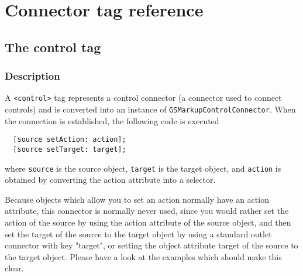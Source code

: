 
\section{Connector tag reference}

\subsection{The control tag}

\subsubsection{Description}
A \texttt{<control>} tag represents a control connector (a connector
used to connect controls) and is converted into an instance of
\texttt{GSMarkupControlConnector}.  When the connection is
established, the following code is executed
\begin{verbatim}
  [source setAction: action];
  [source setTarget: target];
\end{verbatim}
where \texttt{source} is the source object, \texttt{target} is the
target object, and \texttt{action} is obtained by converting the
action attribute into a selector.

Because objects which allow you to set an action normally have an
action attribute, this connector is normally never used, since you
would rather set the action of the source by using the action
attribute of the source object, and then set the target of the source
to the target object by using a standard outlet connector with key
"target", or setting the object attribute target of the source to the
target object.  Please have a look at the examples which should make
this clear.

